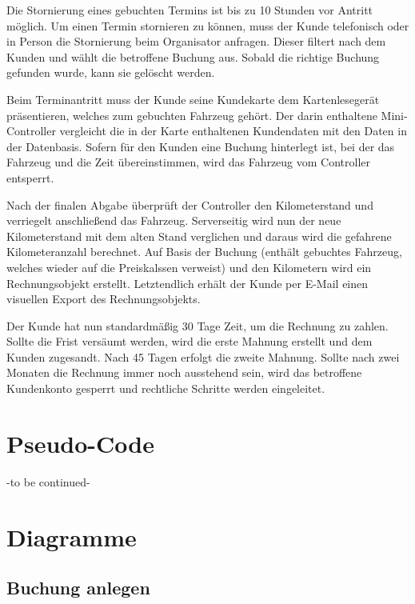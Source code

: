 Die Stornierung eines gebuchten Termins ist bis zu 10 Stunden vor Antritt möglich. Um einen Termin stornieren zu können, muss der Kunde telefonisch oder in Person die Stornierung beim Organisator anfragen. Dieser filtert nach dem Kunden und wählt die betroffene Buchung aus. Sobald die richtige Buchung gefunden wurde, kann sie gelöscht werden.


Beim Terminantritt muss der Kunde seine Kundekarte dem Kartenlesegerät präsentieren, welches zum gebuchten Fahrzeug gehört. Der darin enthaltene Mini-Controller vergleicht die in der Karte enthaltenen Kundendaten mit den Daten in der Datenbasis. Sofern für den Kunden eine Buchung hinterlegt ist, bei der das Fahrzeug und die Zeit übereinstimmen, wird das Fahrzeug vom Controller entsperrt. 


Nach der finalen Abgabe überprüft der Controller den Kilometerstand und verriegelt anschließend das Fahrzeug. Serverseitig wird nun der neue Kilometerstand mit dem alten Stand verglichen und daraus wird die gefahrene Kilometeranzahl berechnet. Auf Basis der Buchung (enthält gebuchtes Fahrzeug, welches wieder auf die Preiskalssen verweist) und den Kilometern wird ein Rechnungsobjekt erstellt. Letztendlich erhält der Kunde per E-Mail einen visuellen Export des Rechnungsobjekts. 


Der Kunde hat nun standardmäßig 30 Tage Zeit, um die Rechnung zu zahlen. Sollte die Frist versäumt werden, wird die erste Mahnung erstellt und dem Kunden zugesandt. Nach 45 Tagen erfolgt die zweite Mahnung. Sollte nach zwei Monaten die Rechnung immer noch ausstehend sein, wird das betroffene Kundenkonto gesperrt und rechtliche Schritte werden eingeleitet. 

\section{Pseudo-Code}

-to be continued-

\section{Diagramme}

\subsection{Buchung anlegen}

